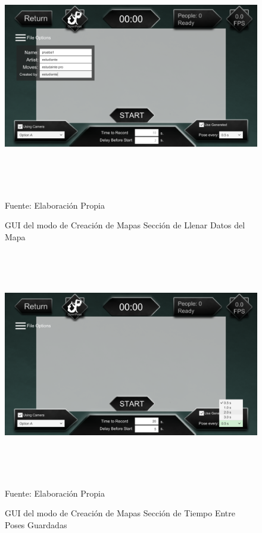 \clearpage
\begin{figure}[h]
	\centering
	\includegraphics[width=16cm,height=10cm]{./Images/crear2.png}
	\caption{GUI del modo de Creación de Mapas Sección de Llenar Datos del Mapa}
	\footnotesize Fuente: Elaboración Propia
	\label{gui3.2}
\end{figure}

\clearpage
\begin{figure}[h]
	\centering
	\includegraphics[width=16cm,height=10cm]{./Images/crear3.png}
	\caption{GUI del modo de Creación de Mapas Sección de Tiempo Entre Poses Guardadas}
	\footnotesize Fuente: Elaboración Propia
	\label{gui3.3}
\end{figure}

